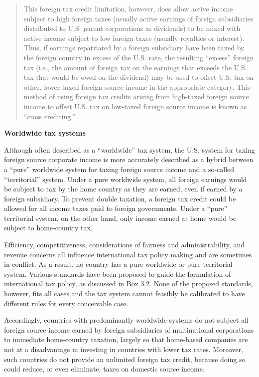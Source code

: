 \begin{select}
\begin{framed}
\begin{quote}
This foreign tax credit limitation, however, does allow active income subject to 
high foreign taxes (usually active earnings of foreign subsidiaries distributed to U.S. 
parent corporations as dividends) to be mixed with active income subject to low foreign 
taxes (usually royalties or interest).  Thus, if earnings repatriated by a foreign subsidiary 
have been taxed by the foreign country in excess of the U.S. rate, the resulting ``excess'' 
foreign tax (i.e., the amount of foreign tax on the earnings that exceeds the U.S. tax that 
would be owed on the dividend) may be used to offset U.S. tax on other, lower-taxed 
foreign source income in the appropriate category.  This method of using foreign tax 
credits arising from high-taxed foreign source income to offset U.S. tax on low-taxed 
foreign source income is known as ``cross crediting.'' 
\end{quote} 
\end{framed}

\begin{center}
\textbf{Worldwide tax systems} 
\end{center}
 
Although often described as a ``worldwide'' tax system, the U.S. system for taxing 
foreign source corporate income is more accurately described as a hybrid between a 
``pure'' worldwide system for taxing foreign source income and a so-called ``territorial'' 
system.  Under a pure worldwide system, all foreign earnings would be subject to tax by 
the home country as they are earned, even if earned by a foreign subsidiary.  To prevent 
double taxation, a foreign tax credit could be allowed for all income taxes paid to foreign 
governments.  Under a ``pure'' territorial system, on the other hand, only income earned at 
home would be subject to home-country tax. 
   
Efficiency, competitiveness, considerations of fairness and administrability, and 
revenue concerns all influence international tax policy making and are sometimes in 
conflict.  As a result, no country has a pure worldwide or pure territorial system.  Various 
standards have been proposed to guide the formulation of international tax policy, as 
discussed in Box 3.2.  None of the proposed standards, however, fits all cases and the tax 
system cannot feasibly be calibrated to have different rules for every conceivable case. 
 
Accordingly, countries with predominantly worldwide systems do not subject all 
foreign source income earned by foreign subsidiaries of multinational corporations to 
immediate home-country taxation, largely so that home-based companies are not at a 
disadvantage in investing in countries with lower tax rates.  Moreover, such countries do 
not provide an unlimited foreign tax credit, because doing so could reduce, or even 
eliminate, taxes on domestic source income. 


\end{select}
